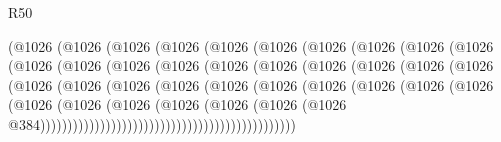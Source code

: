\begin{lexlean}{R50}
\begin{coremodule}
{{{{{{{{{{{{{{{{{{{{{{{{{{{{{{{{{{{{{{{{{{{{{{{{{{{{{{{{{{{{                        (@1026
                          (@1026
                            (@1026
                              (@1026
                                (@1026
                                  (@1026
                                    (@1026
                                      (@1026
                                        (@1026
                                          (@1026
                                            (@1026
                                              (@1026
                                                (@1026
                                                  (@1026
                                                    (@1026
                                                      (@1026
                                                        (@1026
                                                          (@1026
                                                            (@1026
                                                              (@1026
                                                                (@1026
                                                                  (@1026
                                                                    (@1026
                                                                      (@1026
                                                                        (@1026
                                                                          (@1026
                                                                            (@1026
                                                                              (@1026
                                                                                (@1026
                                                                                  (@1026
                                                                                    (@1026
                                                                                      (@1026
                                                                                        (@1026
                                                                                          (@1026
                                                                                            (@1026
                                                                                              (@1026
                                                                                                (@1026
                                                                                                  @384)))))))))))))))))))))))))))))))))))))))))))))))
}}}}}}}}}}}}}}}}}}}}}}}}}}}}}}}}}}}}}}}}}}}}}}}}}}}}}}}}}}}}
\end{coremodule}
\end{lexlean}
